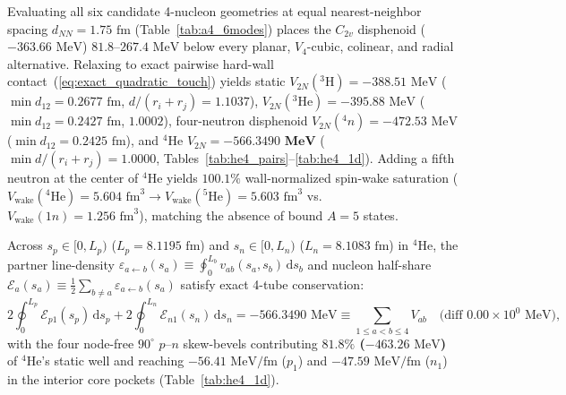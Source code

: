 \documentclass[11pt, a4paper]{article}
\DeclareRobustCommand{\dd}{\mathrm{d}}
\begin{document}
Evaluating all six candidate 4-nucleon geometries at equal nearest-neighbor spacing $d_{NN} = 1.75\text{ fm}$ (Table~\ref{tab:a4_6modes}) places the $C_{2v}$ disphenoid ($-363.66\text{ MeV}$) $81.8\text{--}267.4\text{ MeV}$ below every planar, $V_4$-cubic, colinear, and radial alternative. Relaxing to exact pairwise hard-wall contact~(\ref{eq:exact_quadratic_touch}) yields static $V_{2N}(^3\text{H}) = -388.51\text{ MeV}$ ($\min d_{12} = 0.2677\text{ fm}$, $d/(r_i+r_j) = 1.1037$), $V_{2N}(^3\text{He}) = -395.88\text{ MeV}$ ($\min d_{12} = 0.2427\text{ fm}$, $1.0002$), four-neutron disphenoid $V_{2N}(^4n) = -472.53\text{ MeV}$ ($\min d_{12} = 0.2425\text{ fm}$), and $^4\text{He}$ $V_{2N} = \mathbf{-566.3490\text{ MeV}}$ ($\min d/(r_i+r_j) = 1.0000$, Tables~\ref{tab:he4_pairs}--\ref{tab:he4_1d}). Adding a fifth neutron at the center of $^4\text{He}$ yields $\mathbf{100.1\%}$ wall-normalized spin-wake saturation ($V_{\mathrm{wake}}(^4\text{He}) = 5.604\text{ fm}^3 \to V_{\mathrm{wake}}(^5\text{He}) = 5.603\text{ fm}^3$ vs.\ $V_{\mathrm{wake}}(1n) = 1.256\text{ fm}^3$), matching the absence of bound $A = 5$ states.

Across $s_p \in [0, L_p)$ ($L_p = 8.1195\text{ fm}$) and $s_n \in [0, L_n)$ ($L_n = 8.1083\text{ fm}$) in $^4\text{He}$, the partner line-density $\varepsilon_{a\leftarrow b}(s_a) \equiv \oint_0^{L_b} v_{ab}(s_a, s_b)\,\dd s_b$ and nucleon half-share $\mathcal{E}_a(s_a) \equiv \frac{1}{2}\sum_{b\neq a}\varepsilon_{a\leftarrow b}(s_a)$ satisfy exact 4-tube conservation:
\begin{equation}
    2\oint_0^{L_p} \mathcal{E}_{p1}(s_p)\,\dd s_p + 2\oint_0^{L_n} \mathcal{E}_{n1}(s_n)\,\dd s_n = -566.3490\text{ MeV} \equiv \sum_{1 \le a < b \le 4} V_{ab} \quad \big(\text{diff } 0.00 \times 10^0\text{ MeV}\big),
    \label{eq:he4_4tube_conservation}
\end{equation}
with the four node-free $90^\circ$ $p\text{--}n$ skew-bevels contributing \textbf{$81.8\%$ ($-463.26\text{ MeV}$)} of $^4\text{He}$'s static well and reaching $-56.41\text{ MeV/fm}$ ($p_1$) and $-47.59\text{ MeV/fm}$ ($n_1$) in the interior core pockets (Table~\ref{tab:he4_1d}).
\end{document}
